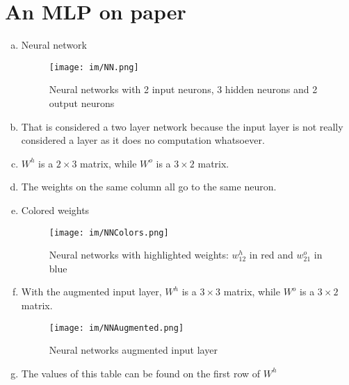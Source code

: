 \documentclass{article}
\begin{document}
\section{An MLP on paper}
\begin{enumerate}[a)]

\item Neural network

    \begin{figure}[!h]
        \centering
        \texttt{[image: im/NN.png]}
        \caption{Neural networks with 2 input neurons, 3 hidden neurons and 2 output neurons}
        \label{fig:NN}
    \end{figure}

\item That is considered a two layer network because the input layer is not really considered a layer as it does no computation whatsoever. 

\item $W^h$ is a $2 \times 3$ matrix, while $W^o$ is a $3 \times 2$ matrix.

\item The weights on the same column all go to the same neuron.

\item Colored weights

    \begin{figure}[!h]
        \centering
        \texttt{[image: im/NNColors.png]}
        \caption{Neural networks with highlighted weights: $w^h_{12}$ in red and $w^o_{21}$ in blue}
        \label{fig:NNColors}
    \end{figure}
    
\pagebreak
\item With the augmented input layer, $W^h$ is a $3 \times 3$ matrix, while $W^o$ is a $3 \times 2$ matrix.

    \begin{figure}[!h]
        \centering
        \texttt{[image: im/NNAugmented.png]}
        \caption{Neural networks augmented input layer}
        \label{fig:NNAugmented}
    \end{figure}

\item The values of this table can be found on the first row of $W^h$

\begin{table}[h]
\end{table}


\end{enumerate}
\end{document}
